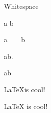 

\begin{frame}[fragile]{Whitespace}
    \setlength\atleastlength{15em}
    \begin{noindentlist}
        \item<+-> a b

        \item<+-> a\ \ \ \ b

        \item<+-> a\quad b.

        \item<+-> a\hspace{2cm}b
        
        \item<+-> \LaTeX is cool!
     
        \item<+-> \LaTeX{} is cool!
    \end{noindentlist}
\end{frame}
